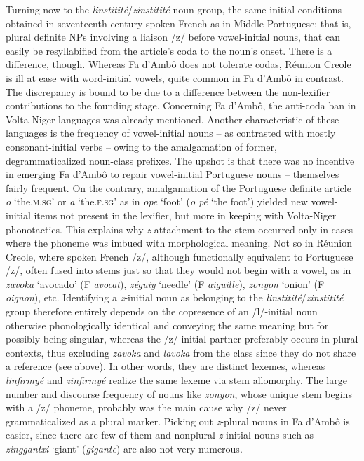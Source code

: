 \documentclass[output=paper]{langscibook}
\begin{document}
Turning now to the \textit{linstitité}/\textit{zinstitité} noun group, the same initial conditions obtained in seventeenth century spoken French as in Middle Portuguese; that is, plural definite NPs involving a liaison /z/ before vowel-initial nouns, that can easily be resyllabified from the article’s coda to the noun’s onset. There is a difference, though. Whereas Fa d’Ambô does not tolerate codas, Réunion Creole is ill at ease with word-initial vowels, quite common in Fa d’Ambô in contrast. The discrepancy is bound to be due to a difference between the non-lexifier contributions to the founding stage. Concerning Fa d’Ambô, the anti-coda ban in Volta-Niger languages was already mentioned. Another characteristic of these languages is the frequency of vowel-initial nouns -- as contrasted with mostly con\-so\-nant-ini\-tial verbs -- owing to the amalgamation of former, degrammaticalized noun-class prefixes. The upshot is that there was no incentive in emerging Fa d’Ambô to repair vowel-initial Portuguese nouns -- themselves fairly frequent. On the contrary, amalgamation of the Portuguese definite article \textit{o} ‘the.\textsc{m.sg}’ or \textit{a} ‘the.\textsc{f.sg}’ as in \textit{ope} ‘foot’ (\textit{o pé} ‘the foot’) yielded new vowel-initial items not present in the lexifier, but more in keeping with Volta-Niger phonotactics. This explains why \textit{z}{}-attachment to the stem occurred only in cases where the phoneme was imbued with morphological meaning. Not so in Réunion Creole, where spoken French /z/, although functionally equivalent to Portuguese /z/, often fused into stems just so that they would not begin with a vowel, as in \textit{zavoka} ‘avocado’ (F \textit{avocat}), \textit{zéguiy} ‘needle’ (F \textit{aiguille}), \textit{zonyon} ‘onion’ (F \textit{oignon}), etc. Identifying a \textit{z}{}-initial noun as belonging to the \textit{linstitité}\slash\textit{zinstitité} group therefore entirely depends on the copresence of an /l/-initial noun otherwise phonologically identical and conveying the same meaning but for possibly being singular, whereas the /z/-initial partner preferably occurs in plural contexts, thus excluding \textit{zavoka} and \textit{lavoka} from the class since they do not share a reference (see above). In other words, they are distinct lexemes, whereas \textit{linfirmyé} and \textit{zinfirmyé} realize the same lexeme via stem allomorphy. The large number and discourse frequency of nouns like \textit{zonyon}, whose unique stem begins with a /z/ phoneme, probably was the main cause why /z/ never grammaticalized as a plural marker. Picking out \textit{z}{}-plural nouns in Fa d’Ambô is easier, since there are few of them and nonplural \textit{z}{}-initial nouns such as \textit{zinggantxi} ‘giant’ (\textit{gigante}) are also not very numerous.
\end{document}
